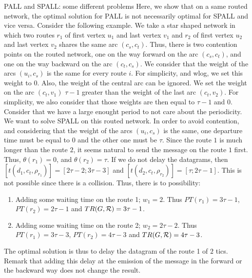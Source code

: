 \documentclass[10pt]{article}
\newcommand\pall{\textsc{PALL}\xspace}
\newcommand\spall{\textsc{SPALL}\xspace}
\begin{document}
     \begin{subsection}{\pall and \spall: some different problems}
Here, we show that on a same routed network, the optimal solution for \pall is not necessarily optimal for \spall and vice versa.
  Consider the following example. We take a star shaped network in which two routes $r_1$ of first vertex $u_1$ and last vertex $v_1$ and $r_2$ of first vertex $u_2$ and last vertex $v_2$ shares the same arc $(c_s,c_t)$. Thus, there is two contention points on the routed network, one on the way forward on the arc $(c_s,c_t )$, and one on the way backward on the arc $(c_t,c_s)$.
  We consider that the weight of the arcs $(u_i,c_s)$ is the same for every route $i$. For simplicity, and wlog, we set this weight to $0$. Also, the weight of the central arc can be ignored.
  We set the weight on the arc $(c_t,v_1)$ $\tau -1$ greater than the weight of the last arc $(c_t,v_2)$. For simplicity, we also consider that those weights are then equal to $\tau-1$ and $0$.
  Consider that we have a large enought period to not care about the periodicity.\\
  
  We want to solve \spall on this routed network. In order to avoid contention, and considering that the weight of the arcs $(u_i,c_s)$ is the same, one departure time must be equal to $0$ and the other one must be $\tau$. Since the route $1$ is much longer than the route $2$, it seems natural to send the message on the route $1$ first. Thus, $\theta(r_1) = 0$, and $\theta (r_2) = \tau $. If we do not delay the datagrams, then $[t(d_1,c_t,\rho_{r_1})] = [2\tau -2;3\tau-3]$ and $[t(d_2,c_t,\rho_{r_2})] = [\tau;2\tau-1]$. This is not possible since there is a collision. 
  Thus, there is to possibility: 
  \begin{enumerate}
                                                                                                                                                                                                                                                                                                                                                                                                                                               \item Adding some waiting time on the route 1; $w_1 = 2$. Thus $PT(r_1) = 3\tau-1$, $PT(r_2) = 2\tau -1$ and $TR(G,{\cal R}) =3\tau-1$. 
\item Adding some waiting time on the route 2; $w_2 = 2\tau-2$. Thus $PT(r_1) = 3\tau-3$, $PT(r_2) = 4\tau -3$ and $TR(G,{\cal R}) = 4\tau-3$.                                                                                                                                                                                                                                                             \end{enumerate}
The optimal solution is thus to delay the datagram of the route 1 of $2$ tics. Remark that adding this delay at the emission of the message in the forward or the backward way does not change the result.


\end{subsection}
\end{document}
